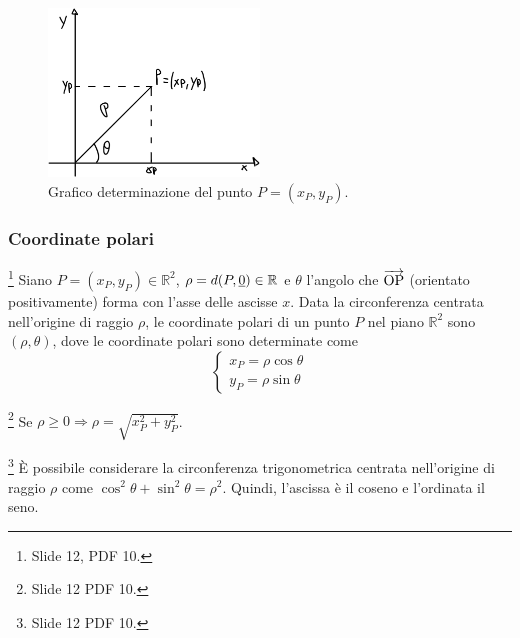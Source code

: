 \begin{figure}
    \centering
    \includegraphics[width=0.5\textwidth]{Analisi2/figures/piano_coordinate_polari.jpeg}
    \caption{Grafico determinazione del punto $P=(x_P,y_P)$.}\label{fig:piano_coordinate_polari}
\end{figure}

\subsubsection{Coordinate polari}
\begin{definition}\footnote{Slide 12, PDF 10.}\label{def:coordinate_polari}
    Siano $P=(x_P,y_P)\in\mathbb R^2$, $\rho=d(P,\uline 0)\in\mathbb R$ e $\theta$ l'angolo che $\overrightarrow{\rm OP}$ (orientato positivamente) forma con l'asse delle ascisse $x$. Data la circonferenza centrata nell'origine di raggio $\rho$, le coordinate polari di un punto $P$ nel piano $\mathbb R^2$ sono $(\rho, \theta)$, dove le coordinate polari sono determinate come
    \begin{equation}\label{eq:coordinate_polari_piano}
        \begin{cases}
            x_P=\rho\cos\theta\\
            y_P=\rho\sin\theta
        \end{cases}
    \end{equation}
\end{definition}

\begin{remark}\footnote{Slide 12 PDF 10.}
    Se $\rho\geq 0\Rightarrow \rho=\sqrt{x_P^2+y_P^2}$.
\end{remark}

\begin{remark}\footnote{Slide 12 PDF 10.}
    È possibile considerare la circonferenza trigonometrica centrata nell'origine di raggio $\rho$ come $\cos^2\theta+\sin^2\theta=\rho^2$. Quindi, l'ascissa è il coseno e l'ordinata il seno.
\end{remark}

